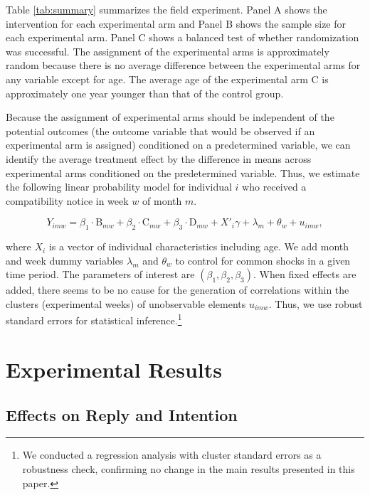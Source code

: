 \documentclass[12pt, a4paper]{article}
\begin{document}
Table \ref{tab:summary} summarizes the field experiment. Panel A shows the intervention for each experimental arm and Panel B shows the sample size for each experimental arm. Panel C shows a balanced test of whether randomization was successful. The assignment of the experimental arms is approximately random because there is no average difference between the experimental arms for any variable except for age. The average age of the experimental arm C is approximately one year younger than that of the control group.

Because the assignment of experimental arms should be independent of the potential outcomes (the outcome variable that would be observed if an experimental arm is assigned) conditioned on a predetermined variable, we can identify the average treatment effect by the difference in means across experimental arms conditioned on the predetermined variable. Thus, we estimate the following linear probability model for individual \(i\) who received a compatibility notice in week \(w\) of month \(m\).

\begin{equation}
  Y_{imw} =
  \beta_1 \cdot \text{B}_{mw} + \beta_2 \cdot \text{C}_{mw} + \beta_3 \cdot \text{D}_{mw}
  + X'_i \gamma + \lambda_m + \theta_w + u_{imw}, \label{eq:reg}
\end{equation}

\noindent
where \(X_i\) is a vector of individual characteristics including age. We add month and week dummy variables \(\lambda_m\) and \(\theta_w\) to control for common shocks in a given time period. The parameters of interest are \((\beta_1, \beta_2, \beta_3)\). When fixed effects are added, there seems to be no cause for the generation of correlations within the clusters (experimental weeks) of unobservable elements \(u_{imw}\). Thus, we use robust standard errors for statistical inference.\footnote{We conducted a regression analysis with cluster standard errors as a robustness check, confirming no change in the main results presented in this paper.}

\hypertarget{result}{%
\section{Experimental Results}\label{result}}

\hypertarget{intention}{%
\subsection{Effects on Reply and Intention}\label{intention}}
\end{document}
